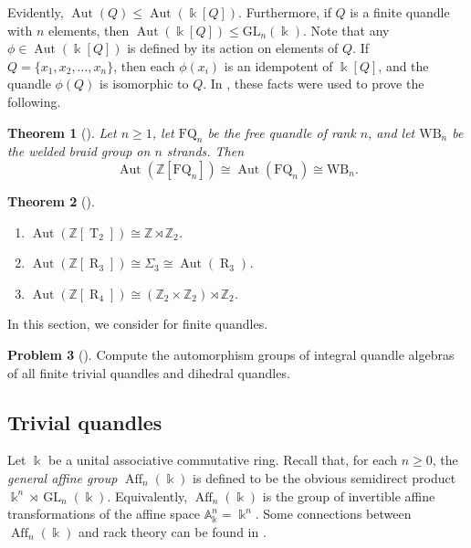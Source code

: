 \documentclass[12 pt]{amsart}
\newtheorem{theorem}{Theorem}[section]
\theoremstyle{definition}
\newtheorem{problem}[theorem]{Problem}
\theoremstyle{remark}
\numberwithin{equation}{section}
\newcommand{\Aut}{\operatorname{Aut}}
\newcommand{\T}{\operatorname{T}}
\newcommand{\R}{\operatorname{R}}
\newcommand{\GL}{\operatorname{GL}}
\newcommand{\Aff}{\operatorname{Aff}}
\renewcommand{\k}{\Bbbk}
\begin{document}
Evidently, $\Aut (Q) \leq \Aut (\k[Q])$. Furthermore, if $Q$ is a finite quandle with $n$ elements, then $\Aut (\k[Q]) \leq \mathrm{GL}_n(\k)$. 
Note that any $\phi \in \Aut (\k[Q])$ is defined by its action on elements of $Q$. If $Q = \{x_1, x_2, \ldots, x_n \}$, then each $\phi(x_i)$ is an idempotent of $\k[Q]$, and the quandle $\phi(Q)$ is isomorphic to $Q$. In \cite{BPS-1, MBMD}, these facts were used to prove the following.

\begin{theorem}[{\cite[Cor. 5.5]{MBMD}}] Let $n\geq 1$, let $\mathrm{FQ}_n$ be the free quandle of rank $n$, and let $\mathrm{WB}_n$ be the welded braid group on $n$ strands. Then 
  $$\Aut( \mathbb{Z}[\mathrm{FQ}_n]) \cong \Aut(\mathrm{FQ}_n)\cong \mathrm{WB}_n.$$
\end{theorem}

\begin{theorem}[{\cite[Thm. 6.1, Prop. 6.3, Thm. 6.4]{BPS-1}}]\label{thm:t2}\phantom{-}
\begin{enumerate}
    \item $\Aut (\mathbb{Z}[\T_2]) \cong \mathbb{Z} \rtimes \mathbb{Z}_2$.
    \item $\Aut (\mathbb{Z}[\R_3]) \cong \Sigma_3 \cong \mathrm{\Aut }(\R_3)$.
    \item $\Aut (\mathbb{Z}[\R_4]) \cong ( \mathbb{Z}_2 \times \mathbb{Z}_2) \rtimes \mathbb{Z}_2$.
\end{enumerate}
\end{theorem}

In this section, we consider \cite[Prob.\ 6.5]{BPS-1} for finite quandles.

\begin{problem}[{\cite[Prob.\ 6.5]{BPS-1}}]\label{prob:aut}
Compute the automorphism groups of integral quandle algebras of all finite trivial quandles and dihedral quandles.
\end{problem}

\subsection{Trivial quandles}
Let $\k$ be a unital associative commutative ring. Recall that, for each $n\geq 0$, the \emph{general affine group} $\Aff_n(\k)$ is defined to be the obvious semidirect product $\k^n\rtimes\GL_n(\k)$. Equivalently, $\Aff_n(\k)$ is the group of invertible affine transformations of the affine space $\mathbb A^n_\k=\k^n$. Some connections between $\Aff_n(\k)$ and rack theory can be found in \cite{LT2}.
\end{document}
